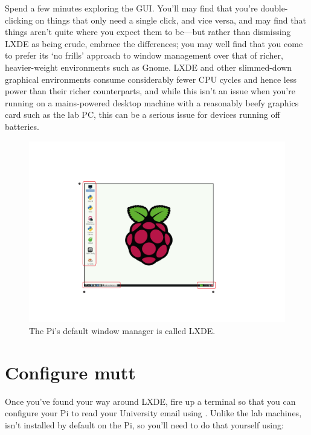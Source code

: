 Spend a few minutes exploring the GUI. You'll may find that you're double-clicking on things that only need a single click, and vice versa, and may find that things aren't quite where you expect them to be---but rather than dismissing LXDE as being crude, embrace the differences; you may well find that you come to prefer its `no frills' approach to window management over that of richer, heavier-weight environments such as Gnome. LXDE and other slimmed-down graphical environments consume considerably fewer CPU cycles and hence less power than their richer counterparts, and while this isn't an issue when you're running on a mains-powered desktop machine with a reasonably beefy graphics card such as the lab PC, this can be a serious issue for devices running off batteries. 

\begin{figure}
\centerline{\includegraphics[width=14cm]{images/lxde-desktop}}
\caption{The Pi's default window manager is called LXDE.}\label{figure:lxde-desktop}
\end{figure}

\section{Configure mutt}

Once you've found your way around LXDE, fire up a terminal so that you can configure your Pi to read your University email using . Unlike the lab machines,  isn't installed by default on the Pi, so you'll need to do that yourself using:


